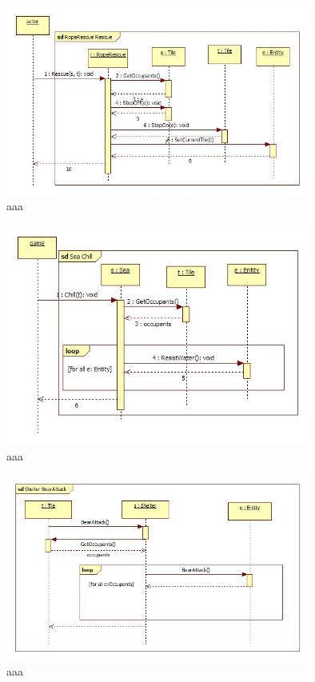 \begin{figure}[H]
        \begin{center}
                \includegraphics[width=10cm]{chapters/chapter07/seqdiag/RopeRescue_Rescue.jpg}
                \caption{aaa}
                \label{bbb}
        \end{center}
\end{figure}
\begin{figure}[H]
        \begin{center}
                \includegraphics[width=10cm]{chapters/chapter07/seqdiag/Sea_Chill.jpg}
                \caption{aaa}
                \label{bbb}
        \end{center}
\end{figure}
\begin{figure}[H]
        \begin{center}
                \includegraphics[width=10cm]{chapters/chapter07/seqdiag/Shelter_BearAttack.jpg}
                \caption{aaa}
                \label{bbb}
        \end{center}
\end{figure}
